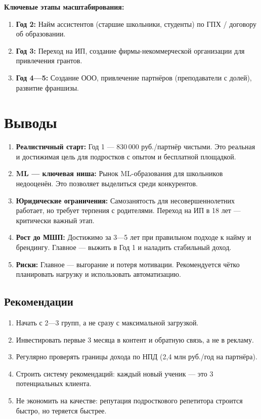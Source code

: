 \documentclass[12pt,a4paper]{article}
\begin{document}
\textbf{Ключевые этапы масштабирования:}
\begin{enumerate}
  \item \textbf{Год 2:} Найм ассистентов (старшие школьники, студенты) по ГПХ / договору об образовании.
  \item \textbf{Год 3:} Переход на ИП, создание фирмы-некоммерческой организации для привлечения грантов.
  \item \textbf{Год 4---5:} Создание ООО, привлечение партнёров (преподаватели с долей), развитие франшизы.
\end{enumerate}

\section*{Выводы}

\begin{enumerate}
  \item \textbf{Реалистичный старт:} Год 1 --- 830\,000 руб./партнёр чистыми. Это реальная и достижимая цель для подростков с опытом и бесплатной площадкой.
  \item \textbf{ML --- ключевая ниша:} Рынок ML-образования для школьников недооценён. Это позволяет выделиться среди конкурентов.
  \item \textbf{Юридические ограничения:} Самозанятость для несовершеннолетних работает, но требует терпения с родителями. Переход на ИП в 18 лет --- критически важный этап.
  \item \textbf{Рост до МШП:} Достижимо за 3---5 лет при правильном подходе к найму и брендингу. Главное --- выжить в Год 1 и наладить стабильный доход.
  \item \textbf{Риски:} Главное --- выгорание и потеря мотивации. Рекомендуется чётко планировать нагрузку и использовать автоматизацию.
\end{enumerate}

\subsection*{Рекомендации}

\begin{enumerate}
  \item Начать с 2---3 групп, а не сразу с максимальной загрузкой.
  \item Инвестировать первые 3 месяца в контент и обратную связь, а не в рекламу.
  \item Регулярно проверять границы дохода по НПД (2,4 млн руб./год на партнёра).
  \item Строить систему рекомендаций: каждый новый ученик --- это 3 потенциальных клиента.
  \item Не экономить на качестве: репутация подросткового репетитора строится быстро, но теряется быстрее.
\end{enumerate}
\end{document}

